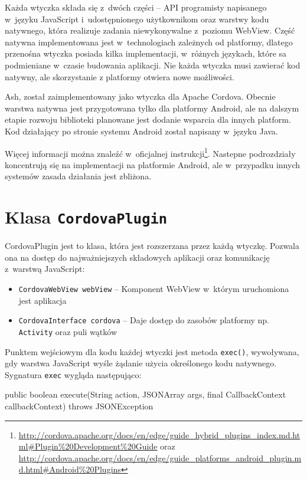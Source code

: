 \documentclass{xmgr}
\begin{document}
Każda wtyczka składa się z~dwóch części -- API programisty napisanego w~języku JavaScript i~udostępnionego użytkownikom oraz warstwy kodu natywnego, która realizuje zadania niewykonywalne z~poziomu WebView. Część natywna implementowana jest w~technologiach zależnych od platformy, dlatego przenośna wtyczka posiada kilka implementacji, w~różnych językach, które sa podmieniane w~czasie budowania aplikacji. Nie każda wtyczka musi zawierać kod natywny, ale skorzystanie z platformy otwiera nowe możliwości.

Ash, został zaimplementowany jako wtyczka dla Apache Cordova. Obecnie warstwa natywna jest przygotowana tylko dla platformy Android, ale na dalszym etapie rozwoju biblioteki planowane jest dodanie wsparcia dla innych platform. Kod działający po stronie systemu Android został napisany w~języku Java.

Więcej informacji można znaleźć w~oficjalnej instrukcji\footnote{
  \url{http://cordova.apache.org/docs/en/edge/guide\_hybrid\_plugins\_index.md.html\#Plugin\%20Development\%20Guide}  
  oraz 
  \url{http://cordova.apache.org/docs/en/edge/guide\_platforms\_android\_plugin.md.html\#Android\%20Plugins}   
}.
Nastepne podrozdziały koncentrują się na implementacji na platformie Android, ale w~przypadku innych systemów zasada działania jest zbliżona.

\section{Klasa \texttt{CordovaPlugin} }

CordovaPlugin jest to klasa, która jest rozszerzana przez każdą wtyczkę. Pozwala ona na dostęp do najważniejszych składowych aplikacji oraz komunikację z~warstwą JavaScript: 

\begin{itemize}
  \item \texttt{CordovaWebView webView} -- Komponent WebView w~którym uruchomiona jest aplikacja
  \item \texttt{CordovaInterface cordova} -- Daje dostęp do zasobów platformy np. \texttt{Activity} oraz puli wątków
\end{itemize}

Punktem wejściowym dla kodu każdej wtyczki jest metoda \texttt{exec()}, wywoływana, gdy warstwa JavaScript wyśle żądanie użycia określonego kodu natywnego. Sygnatura \texttt{exec} wygląda następująco:

\begin{javacode}
public boolean execute(String action, 
                       JSONArray args, 
                       final CallbackContext callbackContext) 
                       throws JSONException
\end{javacode}
\end{document}
